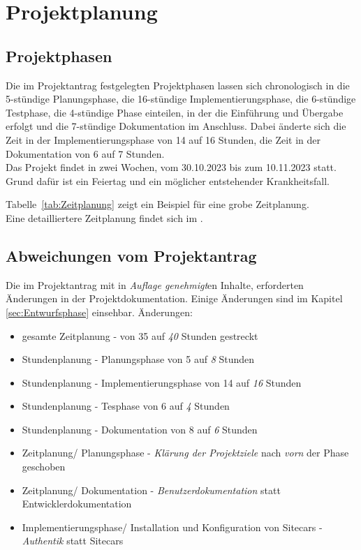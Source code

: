 \section{Projektplanung} 
\label{sec:Projektplanung}


\subsection{Projektphasen}
\label{sec:Projektphasen}
Die im Projektantrag festgelegten Projektphasen lassen sich chronologisch in die 5-stündige Planungsphase, 
die 16-stündige Implementierungsphase, die 6-stündige Testphase, die 4-stündige Phase einteilen, in der die 
Einführung und Übergabe erfolgt und die 7-stündige Dokumentation im Anschluss.
Dabei änderte sich die Zeit in der Implementierungsphase von 14 auf 16 Stunden, die Zeit in der 
Dokumentation von 6 auf 7 Stunden.
\\Das Projekt findet in zwei Wochen, vom 30.10.2023 bis zum 10.11.2023 statt. Grund dafür ist ein Feiertag 
und ein möglicher entstehender Krankheitsfall.

Tabelle~\ref{tab:Zeitplanung} zeigt ein Beispiel für eine grobe Zeitplanung.
\\
Eine detailliertere Zeitplanung findet sich im .


\subsection{Abweichungen vom Projektantrag}
\label{sec:AbweichungenProjektantrag}
Die im Projektantrag mit in \textit{Auflage genehmigt}en Inhalte, erforderten Änderungen in der 
Projektdokumentation. Einige Änderungen sind im Kapitel \ref*{sec:Entwurfsphase} 
 einsehbar. Änderungen:
\begin{itemize}
	\item gesamte Zeitplanung - von 35 auf \textit{40} Stunden gestreckt
	\item Stundenplanung - Planungsphase von 5 auf \textit{8} Stunden
	\item Stundenplanung - Implementierungsphase von 14 auf \textit{16} Stunden
	\item Stundenplanung - Tesphase von 6 auf \textit{4} Stunden
	\item Stundenplanung - Dokumentation von 8 auf \textit{6} Stunden
	\item Zeitplanung/ Planungsphase - \textit{Klärung der Projektziele} nach \textit{vorn} der Phase geschoben
	\item Zeitplanung/ Dokumentation - \textit{Benutzerdokumentation} statt Entwicklerdokumentation
	\item Implementierungsphase/ Installation und Konfiguration von Sitecars - \textit{Authentik} statt Sitecars
\end{itemize}


